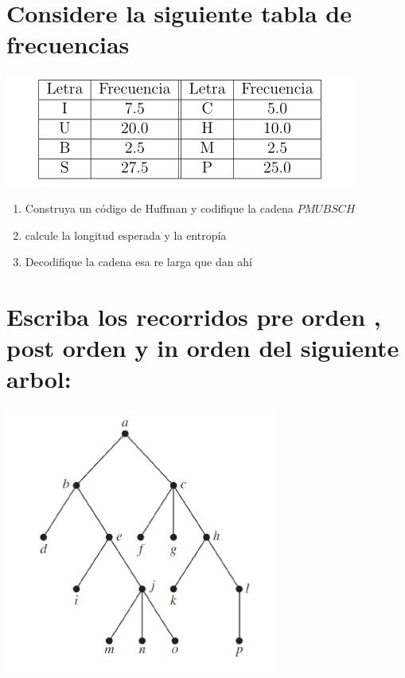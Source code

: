 \documentclass[10pt,a4paper]{article} %
\begin{document}

        \section{Considere la siguiente tabla de frecuencias}
            \begin{center}
                \includegraphics[width=0.4\linewidth]{tabfrec12.png}
            \end{center}

            \begin{enumerate}
                \item {Construya un código de Huffman y codifique la cadena $PMUBSCH$}
                \item {calcule la longitud esperada y la entropía}
                \item {Decodifique la cadena esa re larga que dan ahí}
            \end{enumerate}





        \section{Escriba los recorridos pre orden , post orden y in orden del siguiente arbol:}
            \begin{center}
                \includegraphics[width=0.4\linewidth]{arbolp13.png}
            \end{center}

\end{document}
